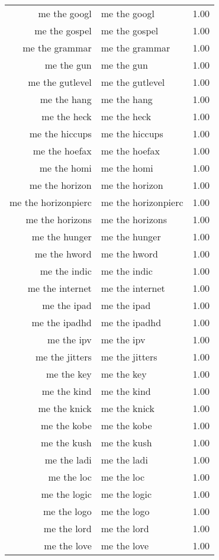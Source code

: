 \begin{table}[ht]
\begin{tabular}{rlr}
  me the googl & me the googl & 1.00 \\ 
  me the gospel & me the gospel & 1.00 \\ 
  me the grammar & me the grammar & 1.00 \\ 
  me the gun & me the gun & 1.00 \\ 
  me the gutlevel & me the gutlevel & 1.00 \\ 
  me the hang & me the hang & 1.00 \\ 
  me the heck & me the heck & 1.00 \\ 
  me the hiccups & me the hiccups & 1.00 \\ 
  me the hoefax & me the hoefax & 1.00 \\ 
  me the homi & me the homi & 1.00 \\ 
  me the horizon & me the horizon & 1.00 \\ 
  me the horizonpierc & me the horizonpierc & 1.00 \\ 
  me the horizons & me the horizons & 1.00 \\ 
  me the hunger & me the hunger & 1.00 \\ 
  me the hword & me the hword & 1.00 \\ 
  me the indic & me the indic & 1.00 \\ 
  me the internet & me the internet & 1.00 \\ 
  me the ipad & me the ipad & 1.00 \\ 
  me the ipadhd & me the ipadhd & 1.00 \\ 
  me the ipv & me the ipv & 1.00 \\ 
  me the jitters & me the jitters & 1.00 \\ 
  me the key & me the key & 1.00 \\ 
  me the kind & me the kind & 1.00 \\ 
  me the knick & me the knick & 1.00 \\ 
  me the kobe & me the kobe & 1.00 \\ 
  me the kush & me the kush & 1.00 \\ 
  me the ladi & me the ladi & 1.00 \\ 
  me the loc & me the loc & 1.00 \\ 
  me the logic & me the logic & 1.00 \\ 
  me the logo & me the logo & 1.00 \\ 
  me the lord & me the lord & 1.00 \\ 
  me the love & me the love & 1.00 \\ 

\end{tabular}
\end{table}

